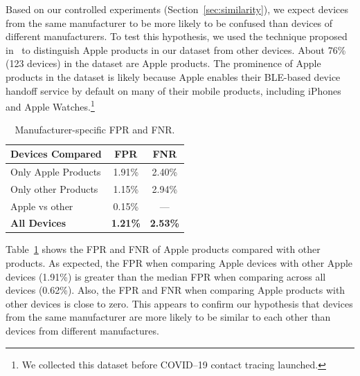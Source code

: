 Based on our controlled experiments (Section~\ref{sec:similarity}), we expect devices from the same manufacturer to be more
likely to be confused than devices of different manufacturers. To test this hypothesis, we used the technique
proposed in~\cite{celosia2020close} to distinguish Apple products in our dataset
from other devices. About 76\% (123 devices) in the dataset are Apple
products. The prominence of Apple products in the dataset is likely
because Apple enables their BLE-based device handoff service by default on many of their mobile products, including iPhones and Apple Watches.\footnote{We collected this dataset before COVID--19 contact tracing launched.}
\begin{table}[!h]
    \centering
    \captionsetup{justification=centering}
    \caption{Manufacturer-specific FPR and FNR.}
    \begin{tabular}{|l|c|c|}
    \hline
    Devices Compared & FPR & FNR \\ \hline
    Only Apple Products & 1.91\% & 2.40\%\\ 
    Only other Products & 1.15\% & 2.94\%\\ 
    Apple vs other & 0.15\% & --- \\ 
    \textbf{All Devices} & \textbf{1.21\%} & \textbf{2.53\%}\\ \hline
    \end{tabular}
    \label{tab:apple_table}
\end{table}



Table~\ref{tab:apple_table} shows the FPR and FNR of Apple products compared
with other products. As expected, the FPR when comparing Apple devices with other Apple devices (1.91\%) is greater than
the median FPR when comparing across all devices (0.62\%). Also, the FPR and FNR when comparing Apple products with 
other devices is close to zero.
This appears to confirm our hypothesis that devices from the same manufacturer are more likely to be similar to each other than devices from different manufactures.

